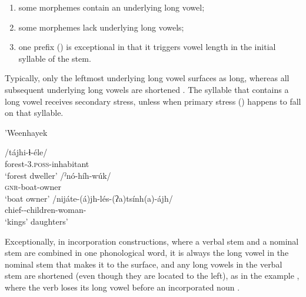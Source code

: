 \begin{enumerate}
  \item some morphemes contain an underlying long vowel;
  \item some morphemes lack underlying long vowels;
  \item one prefix () is exceptional in that it triggers vowel length in the initial syllable of the stem.
\end{enumerate}

Typically, only the leftmost underlying long vowel surfaces as long, whereas all subsequent underlying long vowels are shortened \citep[25--26]{KCnd}. The syllable that contains a long vowel receives secondary stress, unless when primary stress () happens to fall on that syllable.

\ea
'Weenhayek \citep[25--26]{KCnd}\\
    \begin{xlist}
        \ex\gll /tájhi-ɬ-éle/~\\
                forest-3.\textsc{poss}-inhabitant\\
                \glt `forest dweller'
        \ex\gll /ˀnó-híh-wúk/~\\
                {\textsc{gnr}}-boat-owner\\
                \glt `boat owner'
        \ex\gll /nijáte-(á)jh-lés-(ʔa)tsính(a)-ájh/~\\
                {chief-\PL-children-woman-\PL}\\
                \glt `kings' daughters'
    \end{xlist}
\z

Exceptionally, in incorporation constructions, where a verbal stem and a nominal stem are combined in one phonological word, it is always the long vowel in the nominal stem that makes it to the surface, and any long vowels in the verbal stem are shortened (even though they are located to the left), as in the example , where the verb  loses its long vowel before an incorporated noun  \citep[9]{KC94}.

